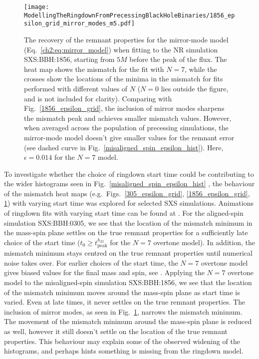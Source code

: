 \begin{figure}[t]
    \centering
    \texttt{[image: ModellingTheRingdownFromPrecessingBlackHoleBinaries/1856\_epsilon\_grid\_mirror\_modes\_m5.pdf]}
    \caption[Recovery of the SXS:BBH:1856 remnant properties using the mirror-mode model starting from $5M$ before the peak of the GW energy flux]{ 
    The recovery of the remnant properties for the mirror-mode model (Eq.~\ref{ch2:eq:mirror_model}) when fitting to the NR simulation SXS:BBH:1856, starting from $5M$ before the peak of the flux. The heat map shows the mismatch for the fit with $N=7$, while the crosses show the locations of the minima in the mismatch for fits performed with different values of $N$ ($N=0$ lies outside the figure, and is not included for clarity). Comparing with Fig.~\ref{1856_epsilon_grid}, the inclusion of mirror modes sharpens the mismatch peak and achieves smaller mismatch values. However, when averaged across the population of precessing simulations, the mirror-mode model doesn't give smaller values for the remnant error (see dashed curve in Fig.~\ref{misaligned_spin_epsilon_hist}). Here, $\epsilon = 0.014$ for the $N=7$ model.
    }
	\label{1856_mirror_mode_epsilon_grid}
\end{figure}

To investigate whether the choice of ringdown start time could be contributing to the wider histograms seen in Fig.~\ref{misaligned_spin_epsilon_hist} %
, the behaviour of the mismatch heat maps (e.g.\ Figs.~\ref{305_epsilon_grid}, \ref{1856_epsilon_grid}, \ref{1856_mirror_mode_epsilon_grid}) with varying start time was explored for selected SXS simulations. 
Animations of ringdown fits with varying start time can be found at \cite{finch_eliot_2021_4538194}.
For the aligned-spin simulation SXS:BBH:0305, we see that the location of the mismatch minimum in the mass-spin plane settles on the true remnant properties for a sufficiently late choice of the start time ($t_0 \geq t_{\mathrm{peak}}^{h_{22}}$ for the $N=7$ overtone model). 
In addition, the mismatch minimum stays centred on the true remnant properties until numerical noise takes over.
For earlier choices of the start time, the $N=7$ overtone model gives biased values for the final mass and spin, see \cite{finch_eliot_2021_4538194}.
Applying the $N=7$ overtone model to the misaligned-spin simulation SXS:BBH:1856, we see that the location of the mismatch minimum moves around the mass-spin plane as start time is varied. Even at late times, it never settles on the true remnant properties.
The inclusion of mirror modes, as seen in Fig.~\ref{1856_mirror_mode_epsilon_grid}, narrows the mismatch minimum. The movement of the mismatch minimum around the mass-spin plane is reduced as well, however it still doesn't settle on the location of the true remnant properties.
This behaviour may explain some of the observed widening of the histograms, and perhaps hints something is missing from the ringdown model.


